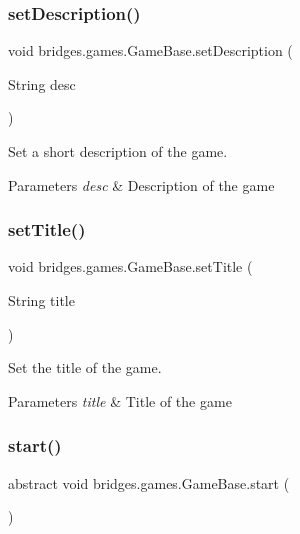 \subsubsection{\texorpdfstring{set\+Description()}{setDescription()}}
{\footnotesize\ttfamily void bridges.\+games.\+Game\+Base.\+set\+Description (\begin{DoxyParamCaption}\item[{String}]{desc }\end{DoxyParamCaption})\hspace{0.3cm}{\ttfamily [protected]}}



Set a short description of the game. 


\begin{DoxyParams}{Parameters}
{\em desc} & Description of the game \\
\hline
\end{DoxyParams}
\mbox{\label{classbridges_1_1games_1_1_game_base_a9f55e84af9bbf6497b314181c9d79f0a}} 
\subsubsection{\texorpdfstring{set\+Title()}{setTitle()}}
{\footnotesize\ttfamily void bridges.\+games.\+Game\+Base.\+set\+Title (\begin{DoxyParamCaption}\item[{String}]{title }\end{DoxyParamCaption})\hspace{0.3cm}{\ttfamily [protected]}}



Set the title of the game. 


\begin{DoxyParams}{Parameters}
{\em title} & Title of the game \\
\hline
\end{DoxyParams}
\mbox{\label{classbridges_1_1games_1_1_game_base_a4b09bc799726e4a59b1ab039b941b188}} 
\subsubsection{\texorpdfstring{start()}{start()}}
{\footnotesize\ttfamily abstract void bridges.\+games.\+Game\+Base.\+start (\begin{DoxyParamCaption}{ }\end{DoxyParamCaption})\hspace{0.3cm}{\ttfamily [abstract]}}



